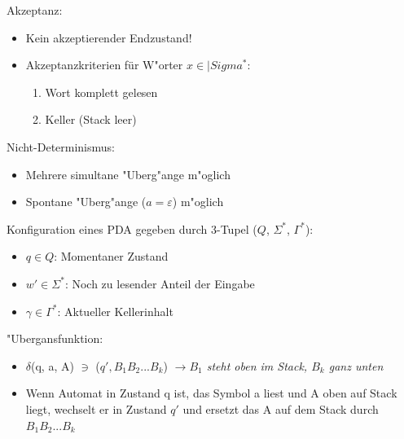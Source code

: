 \documentclass[11pt, a4paper]{scrartcl}
\begin{document}

\vspace{1em}

Akzeptanz:
\begin{itemize}
    \item Kein akzeptierender Endzustand!
    \item Akzeptanzkriterien für W"orter $x \in |Sigma^*$:
    \begin{enumerate}
        \item Wort komplett gelesen
        \item Keller (Stack leer)
    \end{enumerate}
\end{itemize}

\vspace{1em}

Nicht-Determinismus:
\begin{itemize}
    \item Mehrere simultane "Uberg"ange m"oglich
    \item Spontane "Uberg"ange ($a = \varepsilon$) m"oglich
\end{itemize}

\vspace{1em}

Konfiguration eines PDA gegeben durch 3-Tupel ($Q$, $\Sigma^*$, $\Gamma^*$):
\begin{itemize}
    \item $q \in Q$: Momentaner Zustand
    \item $w' \in \Sigma^*$: Noch zu lesender Anteil der Eingabe
    \item $\gamma \in \Gamma^*$: Aktueller Kellerinhalt
\end{itemize}

\vspace{1em}

"Ubergansfunktion:
\begin{itemize}
    \item $\delta$(q, a, A) $\ni$ ($q', B_1B_2...B_k$) \textit{$\rightarrow B_1$ steht oben im Stack, $B_k$ ganz unten}
    \item Wenn Automat in Zustand q ist, das Symbol a liest und A oben auf Stack liegt, wechselt er in Zustand $q'$ und ersetzt das A auf dem Stack durch $B_1B_2...B_k$
\end{itemize}

\newpage
\end{document}
